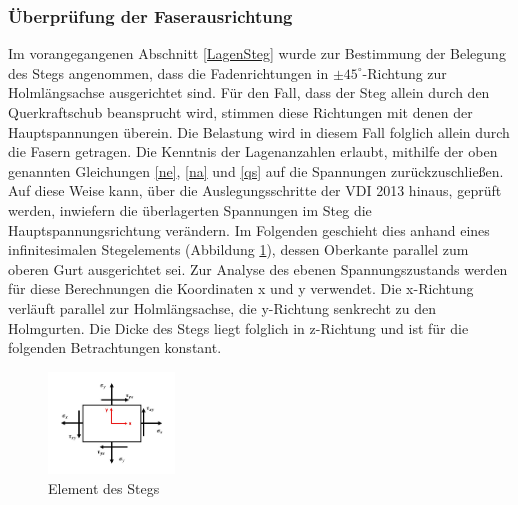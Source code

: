 \subsubsection{Überprüfung der Faserausrichtung}
Im vorangegangenen Abschnitt \ref{LagenSteg} wurde zur Bestimmung der Belegung des Stegs angenommen, dass die Fadenrichtungen in $ \pm 45^{\circ} $-Richtung zur Holmlängsachse ausgerichtet sind. Für den Fall, dass der Steg allein durch den Querkraftschub beansprucht wird, stimmen diese Richtungen mit denen der Hauptspannungen überein. Die Belastung wird in diesem Fall folglich allein durch die Fasern getragen. Die Kenntnis der Lagenanzahlen erlaubt, mithilfe der oben genannten Gleichungen \ref{ne}, \ref{na} und \ref{qs} auf die Spannungen zurückzuschließen. Auf diese Weise kann, über die Auslegungsschritte der VDI 2013 hinaus, geprüft werden, inwiefern die überlagerten Spannungen im Steg die Hauptspannungsrichtung verändern. Im Folgenden geschieht dies anhand eines infinitesimalen Stegelements (Abbildung \ref{fig: Element}), dessen Oberkante parallel zum oberen Gurt ausgerichtet sei. Zur Analyse des ebenen Spannungszustands werden für diese Berechnungen die Koordinaten x und y verwendet. Die x-Richtung verläuft parallel zur Holmlängsachse, die y-Richtung senkrecht zu den Holmgurten. Die Dicke des Stegs liegt folglich in z-Richtung und ist für die folgenden Betrachtungen konstant.  

\begin{figure}[h]
	\includegraphics[width=0.3\textwidth]{Bilder/Element.jpg}
	\centering
	\caption{Element des Stegs}
	\label{fig: Element}
\end{figure}

